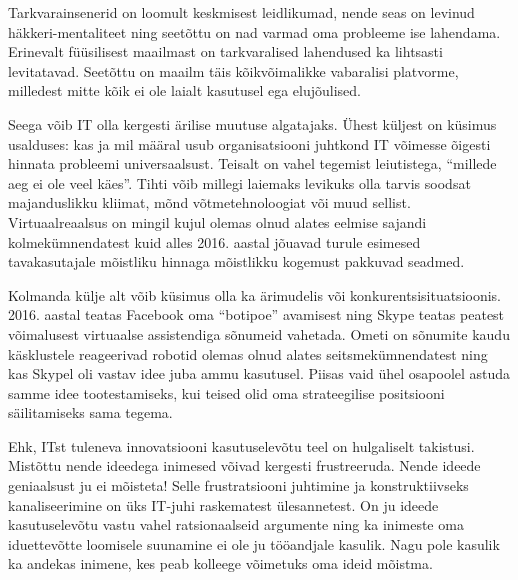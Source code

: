 Tarkvarainsenerid on loomult keskmisest leidlikumad, nende seas on levinud häkkeri-mentaliteet ning seetõttu on nad varmad oma probleeme ise lahendama. Erinevalt füüsilisest maailmast on tarkvaralised lahendused ka lihtsasti levitatavad. Seetõttu on maailm täis kõikvõimalikke vabaralisi platvorme, milledest mitte kõik ei ole laialt kasutusel ega elujõulised. 

Seega võib IT olla kergesti ärilise muutuse algatajaks. Ühest küljest on küsimus usalduses: kas ja mil määral usub organisatsiooni juhtkond IT võimesse õigesti hinnata probleemi universaalsust. Teisalt on vahel tegemist leiutistega, \enquote{millede aeg ei ole veel käes}. Tihti võib millegi laiemaks levikuks olla tarvis soodsat majanduslikku kliimat, mõnd võtmetehnoloogiat või muud sellist. Virtuaalreaalsus on mingil kujul olemas olnud alates eelmise sajandi kolmekümnendatest kuid alles 2016. aastal jõuavad turule esimesed tavakasutajale mõistliku hinnaga mõistlikku kogemust pakkuvad seadmed. 

Kolmanda külje alt võib küsimus olla ka ärimudelis või konkurentsisituatsioonis. 2016. aastal teatas Facebook oma \enquote{botipoe} avamisest ning Skype teatas peatest võimalusest virtuaalse assistendiga sõnumeid vahetada. Ometi on sõnumite kaudu käsklustele reageerivad robotid olemas olnud alates seitsmekümnendatest ning kas Skypel oli vastav idee juba ammu kasutusel. Piisas vaid ühel osapoolel astuda samme idee tootestamiseks, kui teised olid oma strateegilise positsiooni säilitamiseks sama tegema.

Ehk, ITst tuleneva innovatsiooni kasutuselevõtu teel on hulgaliselt takistusi. Mistõttu nende ideedega inimesed võivad kergesti frustreeruda. Nende ideede geniaalsust ju ei mõisteta! Selle frustratsiooni juhtimine ja konstruktiivseks kanaliseerimine on üks IT-juhi raskematest ülesannetest. On ju ideede kasutuselevõtu vastu vahel ratsionaalseid argumente ning ka inimeste oma iduettevõtte loomisele suunamine ei ole ju tööandjale kasulik. Nagu pole kasulik ka andekas inimene, kes peab kolleege võimetuks oma ideid mõistma. 

